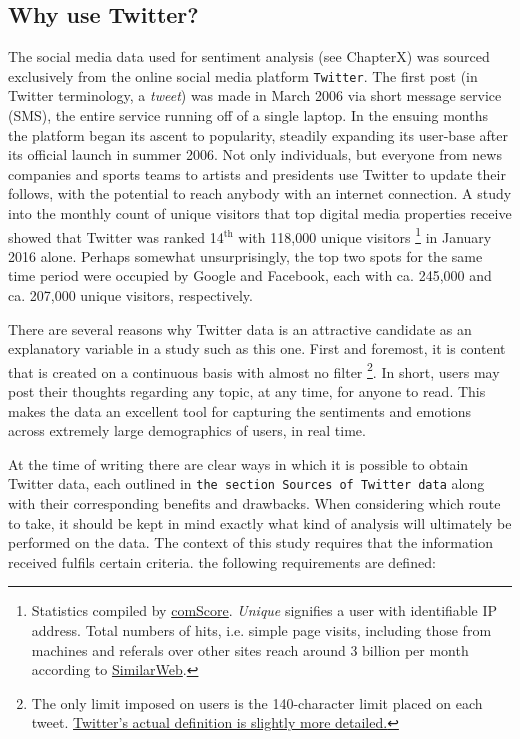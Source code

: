 \documentclass{article}
\begin{document}
\subsection{Why use Twitter?}
\label{sec-2-1}
The social media data used for sentiment analysis (see ChapterX) was sourced exclusively from the online social media platform \texttt{Twitter}. The first post (in Twitter terminology, a \emph{tweet}) was made in March 2006 via short message service (SMS), the entire service running off of a single laptop. In the ensuing months the platform began its ascent to popularity, steadily expanding its user-base after its official launch in summer 2006. Not only individuals, but everyone from news companies and sports teams to artists and presidents use Twitter to update their follows, with the potential to reach anybody with an internet connection.
A study into the monthly count of unique visitors that top digital media properties receive showed that Twitter was ranked 14$^{\text{th}}$ with 118,000 unique visitors \footnote{Statistics compiled by \href{http://www.comscore.com/Insights/Rankings/comScore-Ranks-the-Top-50-US-Digital-Media-Properties-for-January-2016}{comScore}. \emph{Unique} signifies a user with identifiable IP address. Total numbers of hits, i.e. simple page visits, including those from machines and referals over other sites reach around 3 billion per month according to \href{https://www.similarweb.com/website/twitter.com#overview}{SimilarWeb}.} in January 2016 alone. Perhaps somewhat unsurprisingly, the top two spots for the same time period were occupied by Google and Facebook, each with ca. 245,000 and ca. 207,000 unique visitors, respectively.

There are several reasons why Twitter data is an attractive candidate as an explanatory variable in a study such as this one. First and foremost, it is content that is created on a continuous basis with almost no filter \footnote{The only limit imposed on users is the 140-character limit placed on each tweet. \href{https://dev.twitter.com/overview/api/counting-characters}{Twitter's actual definition is slightly more detailed.}}. In short, users may post their thoughts regarding any topic, at any time, for anyone to read. This makes the data an excellent tool for capturing the sentiments and emotions across extremely large demographics of users, in real time.

At the time of writing there are clear ways in which it is possible to obtain Twitter data, each outlined in \texttt{the section Sources of Twitter data} along with their corresponding benefits and drawbacks. When considering which route to take, it should be kept in mind exactly what kind of analysis will ultimately be performed on the data. The context of this study requires that the information received fulfils certain criteria. the following requirements are defined:
\end{document}
